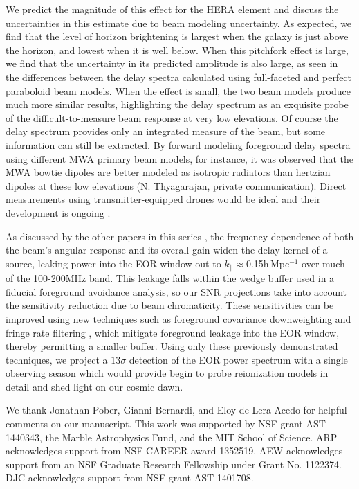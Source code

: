 \documentclass{emulateapj}
\begin{document}
We predict the magnitude of this effect for the HERA element and discuss the uncertainties in this estimate due to beam modeling uncertainty. As expected, we find that the level of horizon brightening is largest when the galaxy is just above the horizon, and lowest when it is well below. When this pitchfork effect is large, we find that the uncertainty in its predicted amplitude is also large, as seen in the differences between the delay spectra calculated using full-faceted and perfect paraboloid beam models. When the effect is small, the two beam models produce much more similar results, highlighting the delay spectrum as an exquisite probe of the difficult-to-measure beam response at very low elevations. Of course the delay spectrum provides only an integrated measure of the beam, but some information can still be extracted. By forward modeling foreground delay spectra using different MWA primary beam models, for instance, it was observed that the MWA bowtie dipoles are better modeled as isotropic radiators than hertzian dipoles at these low elevations (N. Thyagarajan, private communication). Direct measurements using transmitter-equipped drones would be ideal and their development is ongoing \citep{drone1,drone2}.

As discussed by the other papers in this series \citep{ewallwice16,patra16,nithya16}, the frequency dependence of both the beam's angular response and its overall gain widen the delay kernel of a source, leaking power into the EOR window out to $k_\parallel\approx$0.15h\,Mpc$^{-1}$ over much of the 100-200MHz band. This leakage falls within the wedge buffer used in a fiducial foreground avoidance analysis, so our SNR projections take into account the sensitivity reduction due to beam chromaticity. These sensitivities can be improved using new techniques such as foreground covariance downweighting and fringe rate filtering \citep{ali2015,parsonsoptimalfringeratefiltering}, which mitigate foreground leakage into the EOR window, thereby permitting a smaller buffer. Using only these previously demonstrated techniques, we project a $13\sigma$ detection of the EOR power spectrum with a single observing season which would provide begin to probe reionization models in detail and shed light on our cosmic dawn. 

\begin{acknowledgments}
We thank Jonathan Pober, Gianni Bernardi, and Eloy de Lera Acedo for helpful comments on our manuscript. This work was supported by NSF grant AST-1440343, the Marble Astrophysics Fund, and the MIT School of Science. ARP acknowledges support from NSF CAREER award 1352519. AEW acknowledges support from an NSF Graduate Research Fellowship under Grant No. 1122374. DJC acknowledges support from NSF grant AST-1401708.
\end{acknowledgments}
\end{document}
